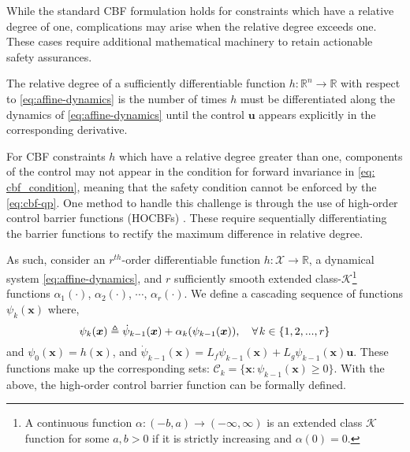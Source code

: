While the standard CBF formulation holds for constraints which have a relative degree of one, complications may arise when the relative degree exceeds one. These cases require additional mathematical machinery to retain actionable safety assurances. 

\begin{definition}
    The relative degree of a sufficiently differentiable function $h : \mathbb{R}^n \rightarrow \mathbb{R}$ with respect to \eqref{eq:affine-dynamics} is the number of times $h$ must be differentiated along the dynamics of \eqref{eq:affine-dynamics} until the control $\boldsymbol{u}$ appears explicitly in the corresponding derivative.
\end{definition}

For CBF constraints $h$ which have a relative degree greater than one, components of the control may not appear in the condition for forward invariance in \eqref{eq: cbf_condition}, meaning that the safety condition cannot be enforced by the \eqref{eq:cbf-qp}. One method to handle this challenge is through the use of high-order control barrier functions (HOCBFs) \cite{xiaoHOCBF2019,xiao2021high,TanHOCBF_2022}. These require sequentially differentiating the barrier functions to rectify the maximum difference in relative degree. 

As such, consider an $r^{th}$-order differentiable function $h : \mathcal{X} \rightarrow \mathbb{R}$, a dynamical system \eqref{eq:affine-dynamics}, and $r$ sufficiently smooth extended class-$\mathcal{K}$\footnote{A continuous function $\alpha : (-b,a) \rightarrow (-\infty,\infty)$ is an extended class $\mathcal{K}$ function for some $a,b > 0$ if it is strictly increasing and $\alpha(0)=0$.} functions $\alpha_1(\cdot)$, $\alpha_2(\cdot)$, $\cdots$, $\alpha_r(\cdot)$. We define a cascading sequence of functions $\psi_k(\boldsymbol{x})$ where,
\begin{equation} \label{eq:HOCBF_psi}
    \psi_k(\boldsymbol{x}) \triangleq \dot{\psi}_{k-1}(\boldsymbol{x}) + \alpha_k(\psi_{k-1}(\boldsymbol{x})), \quad \forall \nspace{2} k \in \{1, 2,...,r\}
\end{equation}
and $\psi_0(\boldsymbol{x})=h(\boldsymbol{x})$, and $\dot{\psi}_{k-1}(\boldsymbol{x}) = L_f \psi_{k-1}(\boldsymbol{x}) + L_g \psi_{k-1}(\boldsymbol{x}) \boldsymbol{u}$. These functions make up the corresponding sets: $\mathcal{C}_{k} = \{ \boldsymbol{x} : \psi_{k-1}(\boldsymbol{x}) \ge 0\}$. With the above, the high-order control barrier function can be formally defined. 

